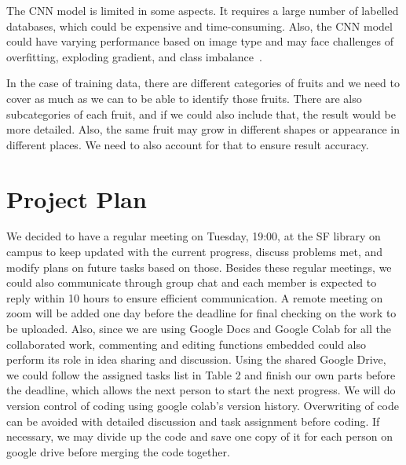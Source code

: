 \documentclass{article} %
\begin{document}
The CNN model is limited in some aspects. It requires a large number of labelled databases, which could be expensive and time-consuming. Also, the CNN model could have varying performance based on image type and may face challenges of overfitting, exploding gradient, and class imbalance~\cite{GeeksforGeeks_2021, deep_cnn_review_2017}.

In the case of training data, there are different categories of fruits and we need to cover as much as we can to be able to identify those fruits. There are also subcategories of each fruit, and if we could also include that, the result would be more detailed. Also, the same fruit may grow in different shapes or appearance in different places. We need to also account for that to ensure result accuracy.

\section{Project Plan}
We decided to have a regular meeting on Tuesday, 19:00, at the SF library on campus to keep updated with the current progress, discuss problems met, and modify plans on future tasks based on those. Besides these regular meetings, we could also communicate through group chat and each member is expected to reply within 10 hours to ensure efficient communication. A remote meeting on zoom will be added one day before the deadline for final checking on the work to be uploaded. Also, since we are using Google Docs and Google Colab for all the collaborated work, commenting and editing functions embedded could also perform its role in idea sharing and discussion. Using the shared Google Drive, we could follow the assigned tasks list in Table 2 and finish our own parts before the deadline, which allows the next person to start the next progress. We will do version control of coding using google colab’s version history. Overwriting of code can be avoided with detailed discussion and task assignment before coding.  If necessary, we may divide up the code and save one copy of it for each person on google drive before merging the code together.
\clearpage
\end{document}
